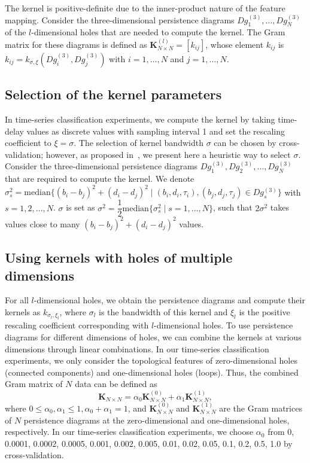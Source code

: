 \documentclass[twocolumn,pre,amsmath,amssymb]{revtex4-1}
\begin{document}
	The kernel is positive-definite due to the inner-product nature of the feature mapping. Consider the three-dimensional persistence diagrams $Dg^{(3)}_1, \ldots, Dg^{(3)}_N$ of the $l$-dimensional holes that are needed to compute the kernel. The Gram matrix for these diagrams is defined as $\mathbf{K}^{(l)}_{N\times N}=[k_{ij}]$, whose element $k_{ij}$ is $k_{ij}=k_{\sigma,\xi}(Dg^{(3)}_i, Dg^{(3)}_j)$ with $i=1,\ldots,N$ and $j=1,\ldots,N$.
	
\subsection{Selection of the kernel parameters}
	In time-series classification experiments, we compute the kernel by taking time-delay values as discrete values with sampling interval 1 and set the rescaling coefficient to $\xi=\sigma$. 
	The selection of kernel bandwidth $\sigma$ can be chosen by cross-validation; however, as proposed in~\cite{gretton:nips:2007}, we present here a heuristic way to select $\sigma$.
	Consider the three-dimensional persistence diagrams $Dg_1^{(3)}, Dg_2^{(3)}, \ldots, Dg_N^{(3)}$ that are required to compute the kernel. We denote $\sigma^2_s = \text{median}\{(b_i-b_j)^2+(d_i-d_j)^2 \mid (b_i, d_i, \tau_i), (b_j, d_j, \tau_j) \in Dg_s^{(3)}\}$ with $s=1,2,\ldots,N$. 
	$\sigma$ is set as $\sigma^2 = \dfrac{1}{2}\text{median}\{\sigma^2_s \mid s = 1,\ldots,N\}$, such that $2\sigma^2$ takes values close to many $(b_i-b_j)^2+(d_i-d_j)^2$ values.

\subsection{Using kernels with holes of multiple dimensions}
	For all $l$-dimensional holes, we obtain the persistence diagrams and compute their kernels as $k_{\sigma_l, \xi_l}$, where $\sigma_l$ is the bandwidth of this kernel and $\xi_l$ is the positive rescaling coefficient corresponding with $l$-dimensional holes. To use persistence diagrams for different dimensions of holes, we can combine the kernels at various dimensions through linear combinations. In our time-series classification experiments, we only consider the topological features of zero-dimensional holes (connected components) and one-dimensional holes (loops). Thus, the combined Gram matrix of $N$ data can be defined as
	\begin{equation}
	\mathbf{K}_{N\times N}=\alpha_0\mathbf{K}^{(0)}_{N\times N} + \alpha_1\mathbf{K}^{(1)}_{N\times N},
	\end{equation}
	where $0 \leq \alpha_0, \alpha_1 \leq 1, \alpha_0 + \alpha_1=1$, and $\mathbf{K}^{(0)}_{N\times N}$ and $\mathbf{K}^{(1)}_{N\times N}$ are the Gram matrices of $N$ persistence diagrams at the zero-dimensional and one-dimensional holes, respectively. In our time-series classification experiments, we choose $\alpha_0$ from 0, 0.0001, 0.0002, 0.0005, 0.001, 0.002, 0.005, 0.01, 0.02, 0.05, 0.1, 0.2, 0.5, 1.0 by cross-validation.
	
\end{document}
